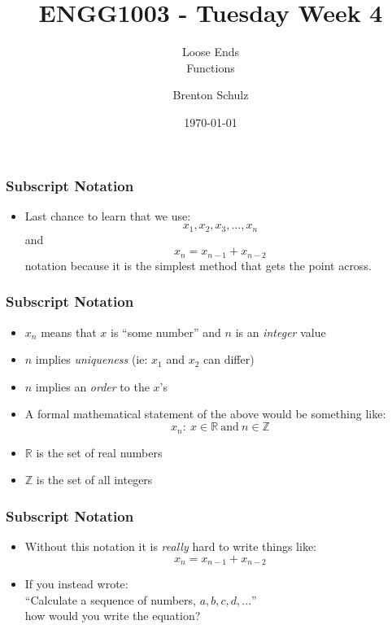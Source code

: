 \documentclass[14pt]{beamer}
\title{ENGG1003 - Tuesday Week 4}
\subtitle{Loose Ends \\ Functions}
\author{Brenton Schulz}
\institute{University of Newcastle}
\date{\today}
\begin{document}
\titlepage

\begin{frame}
\frametitle{Subscript Notation}
\begin{itemize}
\item Last chance to learn that we use:
\begin{equation}
x_1, x_2, x_3, ... , x_n
\end{equation}
and
\begin{equation}
x_n = x_{n-1} + x_{n-2}
\end{equation}
notation because it is the simplest method that gets the point across.
\end{itemize}
\end{frame}

\begin{frame}[fragile]
\frametitle{Subscript Notation}
\begin{itemize}
\item $x_n$ means that $x$ is ``some number'' and $n$ is an \textit{integer} value
\item $n$ implies \textit{uniqueness} (ie: $x_1$ and $x_2$ can differ)
\item $n$ implies an \textit{order} to the $x$'s
\item A formal mathematical statement of the above would be something like:
\begin{equation}
x_n :~x \in \mathbb{R}~\textrm{and} ~ n \in \mathbb{Z}
\end{equation}
\item $\mathbb{R}$ is the set of real numbers
\item $\mathbb{Z}$ is the set of all integers
\end{itemize}
\end{frame}

\begin{frame}[fragile]
\frametitle{Subscript Notation}
\begin{itemize}
\item Without this notation it is \textit{really} hard to write things like:
\begin{equation}
x_n = x_{n-1} + x_{n-2}
\end{equation}
\item If you instead wrote:\\
``Calculate a sequence of numbers, $a,b,c,d,...$''\\
how would you write the equation?
\end{itemize}
\end{frame}
\end{document}
